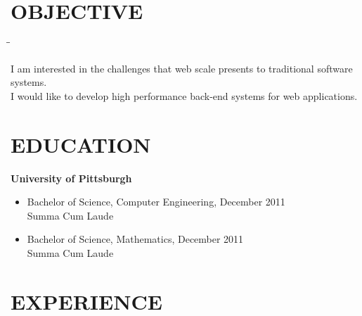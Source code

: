 \documentclass{res}
\begin{document}
\begin{resume}



\section{OBJECTIVE}          
\vspace{-0.15in}

  \begin{tabbing}

   \hspace{2.3in}\= \hspace{2.6in}\= \kill %


I am interested in the challenges that web scale presents to traditional
software systems.\\
I would like to develop high performance back-end systems for web
applications.

   \end{tabbing}
                
 

\section{EDUCATION}          
\vspace{0.15in}
{\bf University of Pittsburgh}         \\


\begin{itemize}
\item Bachelor of Science, Computer Engineering, December 2011\\
    {\small Summa Cum Laude}       


\item Bachelor of Science, Mathematics, December 2011\\
{\small Summa Cum Laude}
\end{itemize}


 

\section{EXPERIENCE}

\vspace{-0.1in}

   \begin{tabbing}


\end{tabbing}
\end{resume}
\end{document}
